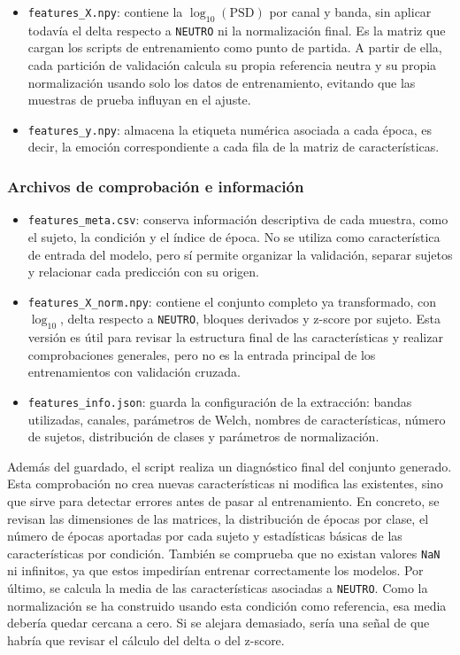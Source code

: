 \begin{itemize}
    \item \texttt{features\_X.npy}: contiene la \(\log_{10}(\mathrm{PSD})\) por canal y banda, sin aplicar todavía el delta respecto a \texttt{NEUTRO} ni la normalización final. Es la matriz que cargan los scripts de entrenamiento como punto de partida. A partir de ella, cada partición de validación calcula su propia referencia neutra y su propia normalización usando solo los datos de entrenamiento, evitando que las muestras de prueba influyan en el ajuste.
    \item \texttt{features\_y.npy}: almacena la etiqueta numérica asociada a cada época, es decir, la emoción correspondiente a cada fila de la matriz de características.
\end{itemize}

\subsubsection{Archivos de comprobación e información}

\begin{itemize}
    \item \texttt{features\_meta.csv}: conserva información descriptiva de cada muestra, como el sujeto, la condición y el índice de época. No se utiliza como característica de entrada del modelo, pero sí permite organizar la validación, separar sujetos y relacionar cada predicción con su origen.
    \item \texttt{features\_X\_norm.npy}: contiene el conjunto completo ya transformado, con \(\log_{10}\), delta respecto a \texttt{NEUTRO}, bloques derivados y z-score por sujeto. Esta versión es útil para revisar la estructura final de las características y realizar comprobaciones generales, pero no es la entrada principal de los entrenamientos con validación cruzada.
    \item \texttt{features\_info.json}: guarda la configuración de la extracción: bandas utilizadas, canales, parámetros de Welch, nombres de características, número de sujetos, distribución de clases y parámetros de normalización.
\end{itemize}

Además del guardado, el script realiza un diagnóstico final del conjunto generado. Esta comprobación no crea nuevas características ni modifica las existentes, sino que sirve para detectar errores antes de pasar al entrenamiento. En concreto, se revisan las dimensiones de las matrices, la distribución de épocas por clase, el número de épocas aportadas por cada sujeto y estadísticas básicas de las características por condición. También se comprueba que no existan valores \texttt{NaN} ni infinitos, ya que estos impedirían entrenar correctamente los modelos. Por último, se calcula la media de las características asociadas a \texttt{NEUTRO}. Como la normalización se ha construido usando esta condición como referencia, esa media debería quedar cercana a cero. Si se alejara demasiado, sería una señal de que habría que revisar el cálculo del delta o del z-score.

